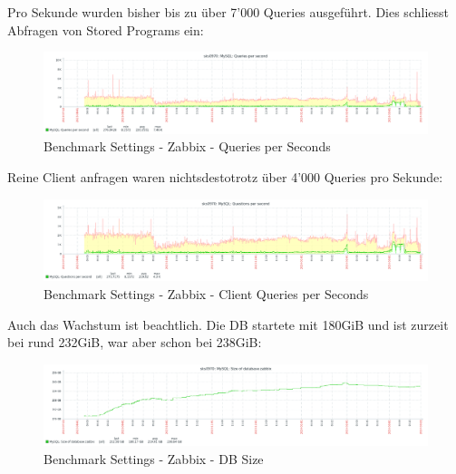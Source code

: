 \begin{flushleft}
    Pro Sekunde wurden bisher bis zu über 7'000 Queries ausgeführt.
    Dies schliesst Abfragen von Stored Programs ein:
    \begin{figure}[H]
        \centering
        \includegraphics[width=0.8\linewidth]{source/implementation/evaluation/benchmarking/sks0970_zabbix_mariadb_queries_per_second_graph}
        \caption{Benchmark Settings - Zabbix - Queries per Seconds}
        \label{fig:sks0970_zabbix_mariadb_queries_per_second_graph}
    \end{figure}
    Reine Client anfragen waren nichtsdestotrotz über 4'000 Queries pro Sekunde:
    \begin{figure}[H]
        \centering
        \includegraphics[width=0.8\linewidth]{source/implementation/evaluation/benchmarking/sks0970_zabbix_mariadb_questions_per_second_graph}
        \caption{Benchmark Settings - Zabbix - Client Queries per Seconds}
        \label{fig:sks0970_zabbix_mariadb_questions_per_second_graph}
    \end{figure}
\end{flushleft}
\begin{flushleft}
    Auch das Wachstum ist beachtlich.
    Die DB startete mit 180GiB und ist zurzeit bei rund 232GiB, war aber schon bei 238GiB:
    \begin{figure}[H]
        \centering
        \includegraphics[width=0.8\linewidth]{source/implementation/evaluation/benchmarking/sks0970_zabbix_mariadb_size_graph}
        \caption{Benchmark Settings - Zabbix - DB Size}
        \label{fig:sks0970_zabbix_mariadb_size_graph}
    \end{figure}
\end{flushleft}
